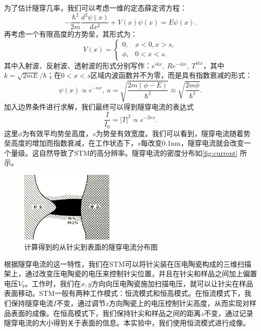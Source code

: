 \documentclass[font=default]{mpltx}
\begin{document}
为了估计隧穿几率，我们可以考虑一维的定态薛定谔方程：
\begin{equation}
  -\frac{\hbar^2}{2m} \frac{d^2\psi(x)}{dx^2} + V(x) \psi(x) = E \psi(x).
\end{equation}
再考虑一个有限高度的方势垒，其形式为：
\begin{equation}
  V(x) = \begin{cases}
    0, & x < 0, x > s, \\
    \phi, & 0 < x < s.
  \end{cases}
\end{equation}
其中入射波、反射波、透射波的形式分别写作：$e^{ikx},\ Re^{-ikx},\ T^{ikx}$，其中$k=\sqrt{2mE}/\hbar$；在$0<x<s$区域内波函数并不为零，而是具有指数衰减的形式：
\begin{equation}
  \psi(x) \propto e^{-\kappa x},\ \kappa = \sqrt{\frac{2m(\phi-E)}{\hbar^2}}\approx \sqrt{\frac{2m\phi}{\hbar^2}}.
\end{equation}
加入边界条件进行求解，我们最终可以得到隧穿电流的表达式
\begin{equation}
  \frac{I}{I_0}=|T|^2\propto e^{-2\kappa s}.
\end{equation}
这里$\phi$为有效平均势垒高度，$s$为势垒有效宽度。我们可以看到，隧穿电流随着势垒高度的增加而指数衰减，在工作状态下，$s$每改变0.1nm，隧穿电流就会改变一个量级。这自然导致了STM的高分辨率。隧穿电流的密度分布如\autoref{fig:current} 所示。
\begin{figure}
  \centering
  \includegraphics[width=0.4\textwidth]{fig/current.png}
  \caption{计算得到的从针尖到表面的隧穿电流分布图}
  \label{fig:current}
\end{figure}

根据隧穿电流的这一特性，我们在STM可以将针尖装在压电陶瓷构成的三维扫描架上，通过改变压电陶瓷的电压来控制针尖位置，并且在针尖和样品之间加上偏置电压$V_b$。工作时，我们在$x,y$方向向压电陶瓷施加扫描电压，就可以让针尖在样品表面移动。STM一般有两种工作模式：恒流模式和恒高模式。在恒流模式下，我们保持隧穿电流$I$不变，通过调节$z$方向陶瓷上的电压控制针尖高度，从而实现对样品表面的成像。在恒高模式下，我们保持针尖和样品之间的距离$z$不变，通过记录隧穿电流的大小得到关于表面的信息。本实验中，我们使用恒流模式进行成像。
\end{document}

